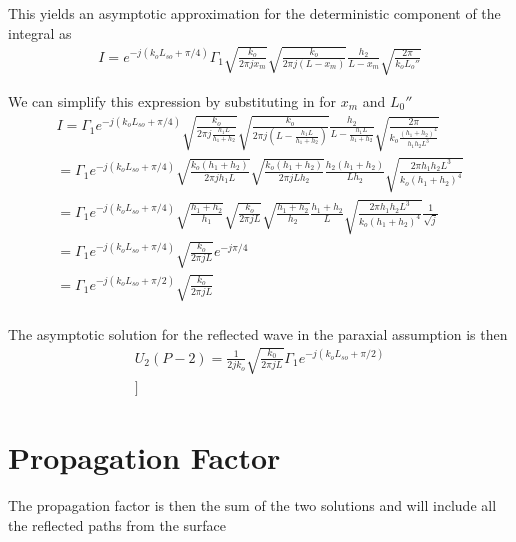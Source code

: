 This yields an asymptotic approximation for the deterministic component of the integral as
\begin{equation}
\begin{gathered}
I = e^{-j\left(k_oL_{so}+\pi/4\right)}\Gamma_1 \sqrt{\frac{k_o}{2\pi jx_m}}\sqrt{\frac{k_o}{2\pi j (L-x_m)}}\frac{h_2}{L-x_m}\sqrt{\frac{2\pi}{k_oL_o''}} 
\end{gathered}
\label{mp_eq:26}
\end{equation}

We can simplify this expression by substituting in for $x_m$ and $L_0''$
\begin{equation}
\begin{gathered}
I= \Gamma_1e^{-j\left(k_oL_{so}+\pi/4\right)}\sqrt{\frac{k_o}{2\pi j\frac{h_1L}{h_1+h_2}}}\sqrt{\frac{k_o}{2\pi j (L-\frac{h_1L}{h_1+h_2})}}\frac{h_2}{L-\frac{h_1L}{h_1+h_2}}\sqrt{\frac{2\pi}{k_o\frac{(h_1+h_2)^4}{h_1h_2L^3}}} \\
= \Gamma_1e^{-j\left(k_oL_{so}+\pi/4\right)} \sqrt{\frac{k_o(h_1+h_2)}{2\pi jh_1L}}\sqrt{\frac{k_o(h_1+h_2)}{2\pi jLh_2}}\frac{h_2(h_1+h_2)}{Lh_2}\sqrt{\frac{2\pi h_1h_2L^3}{k_o(h_1+h_2)^4}} \\
= \Gamma_1e^{-j\left(k_oL_{so}+\pi/4\right)}  \sqrt{\frac{h_1+h_2}{h_1}}\sqrt{\frac{k_o}{2\pi j L}}\sqrt{\frac{h_1+h_2}{h_2}}\frac{h_1+h_2}{L}\sqrt{\frac{2\pi h_1h_2L^3}{k_o(h_1+h_2)^4}}\frac{1}{\sqrt{j}} \\
= \Gamma_1e^{-j\left(k_oL_{so}+\pi/4\right)}\sqrt{\frac{k_o}{2\pi jL}}e^{-j\pi/4} \\
= \Gamma_1e^{-j\left(k_oL_{so}+\pi/2\right)}\sqrt{\frac{k_o}{2\pi jL}} \\
\end{gathered}
\label{mp_eq:27}
\end{equation}

The asymptotic solution for the reflected wave in the paraxial assumption is then
\begin{equation}
\begin{gathered}
U_2(P-2)= \frac{1}{2jk_o}\sqrt{\frac{k_0}{2\pi jL}} \Gamma_1e^{-j\left(k_oL_{so}+\pi/2\right)} \\]
\label{mp_eq:27a}
\end{gathered}
\end{equation}
\renewcommand{\baselinestretch}{2} \small\normalsize

\section{Propagation Factor}
The propagation factor is then the sum of the two solutions and will include all the reflected paths from the surface

